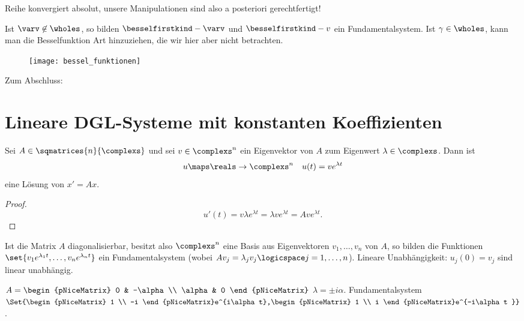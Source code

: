 Reihe konvergiert absolut, unsere Manipulationen sind also a posteriori gerechtfertigt!

Ist \( \varv\not\in \wholes \), so bilden \( \besselfirstkind-{\varv}{} \) und \( \besselfirstkind-{v}{} \) ein Fundamentalsystem. Ist \( \gamma\in \wholes \), kann man \zb die Besselfunktion  Art hinzuziehen, die wir hier aber nicht betrachten.
\begin{figure}[H]
  \centering
  \texttt{[image: bessel\_funktionen]}
  \label{fig:bessel_funktionen}
\end{figure}
Zum Abschluss:
\section*{Lineare DGL-Systeme mit konstanten Koeffizienten}
\begin{lemma}\label{eigenwert_von_konstanter_matrix_dgl_liefert_exp_loesung}
  Sei \( A\in \sqmatrices{n}{\complexs} \) und sei \( v\in \complexs^n \) ein Eigenvektor von \( A \) zum Eigenwert \( \lambda\in \complexs \). Dann ist
  \begin{equation*}
    u\maps \reals\to \complexs^n\quad u(t)=ve^{\lambda t}
  \end{equation*}
  eine Lösung von \( x'=Ax \).
\end{lemma}
\begin{proof}
  \begin{equation*}
    u'(t)=v\lambda e^{\lambda t}=\lambda v e^{\lambda t}=A v e^{\lambda t}.
  \end{equation*}
  
\end{proof}
\begin{folgerung*}
  Ist die Matrix \( A \) diagonalisierbar, besitzt also \( \complexs^n \) eine Basis aus Eigenvektoren \( v_1,\dotsc,v_n \) von \( A \), so bilden die Funktionen \( \set{v_1 e^{\lambda_1 t},\dotsc, v_n e^{\lambda_n t}} \) ein Fundamentalsystem (wobei \( Av_j=\lambda_j v_j \logicspace j=1,\dotsc,n\)). Lineare Unabhängigkeit: \( u_j(0)=v_j \) sind linear unabhängig.
\end{folgerung*}
\begin{beispiel*}
  \( A=\begin{pNiceMatrix} 0 & -\alpha \\ \alpha & 0 \end{pNiceMatrix} \) \timplies \( \lambda=\pm i\alpha \). Fundamentalsystem \( \Set{\begin{pNiceMatrix} 1 \\ -i \end{pNiceMatrix}e^{i\alpha t},\begin{pNiceMatrix} 1 \\ i \end{pNiceMatrix}e^{-i\alpha t }} \).
\end{beispiel*}
